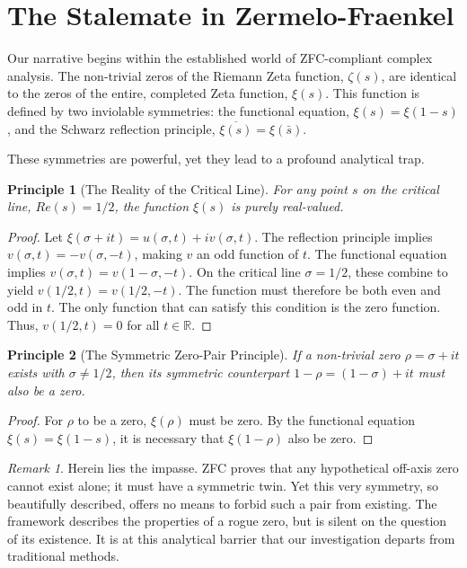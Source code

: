 \documentclass{article}
\theoremstyle{plain}
\newtheorem{principle}{Principle}[section] %
\theoremstyle{definition}
\theoremstyle{remark}
\newtheorem*{remark}{Remark}
\begin{document}
\section{The Stalemate in Zermelo-Fraenkel}
\label{sec:impasse}

Our narrative begins within the established world of ZFC-compliant complex analysis. The non-trivial zeros of the Riemann Zeta function, $\zeta(s)$, are identical to the zeros of the entire, completed Zeta function, $\xi(s)$. This function is defined by two inviolable symmetries: the functional equation, $\xi(s) = \xi(1-s)$, and the Schwarz reflection principle, $\overline{\xi(s)} = \xi(\bar{s})$.

These symmetries are powerful, yet they lead to a profound analytical trap.

\begin{principle}[The Reality of the Critical Line]
For any point $s$ on the critical line, $Re(s)=1/2$, the function $\xi(s)$ is purely real-valued.
\end{principle}
\begin{proof}
Let $\xi(\sigma+it) = u(\sigma,t) + iv(\sigma,t)$. The reflection principle implies $v(\sigma,t) = -v(\sigma,-t)$, making $v$ an odd function of $t$. The functional equation implies $v(\sigma,t) = v(1-\sigma,-t)$. On the critical line $\sigma=1/2$, these combine to yield $v(1/2, t) = v(1/2, -t)$. The function must therefore be both even and odd in $t$. The only function that can satisfy this condition is the zero function. Thus, $v(1/2, t) = 0$ for all $t \in \mathbb{R}$.
\end{proof}

\begin{principle}[The Symmetric Zero-Pair Principle]
If a non-trivial zero $\rho = \sigma + it$ exists with $\sigma \neq 1/2$, then its symmetric counterpart $1-\rho = (1-\sigma)+it$ must also be a zero.
\end{principle}
\begin{proof}
For $\rho$ to be a zero, $\xi(\rho)$ must be zero. By the functional equation $\xi(s) = \xi(1-s)$, it is necessary that $\xi(1-\rho)$ also be zero.
\end{proof}

\begin{remark}
Herein lies the impasse. ZFC proves that any hypothetical off-axis zero cannot exist alone; it must have a symmetric twin. Yet this very symmetry, so beautifully described, offers no means to forbid such a pair from existing. The framework describes the properties of a rogue zero, but is silent on the question of its existence. It is at this analytical barrier that our investigation departs from traditional methods.
\end{remark}
\end{document}
